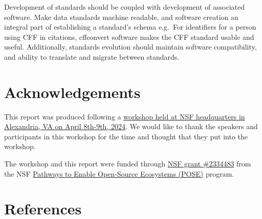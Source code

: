 \documentclass[
  letterpaper,
  DIV=11,
  numbers=noendperiod]{scrartcl}
\begin{document}
Development of standards should be coupled with development of
associated software. Make data standards machine readable, and software
creation an integral part of establishing a standard's schema e.g.~For
identifiers for a person using CFF in citations, cffconvert software
makes the CFF standard usable and useful. Additionally, standards
evolution should maintain software compatibility, and ability to
translate and migrate between standards.

\section{Acknowledgements}\label{acknowledgements}

This report was produced following a
\href{https://uwescience.github.io/2024-open-source-standards-workshop/}{workshop
held at NSF headquarters in Alexandria, VA on April 8th-9th, 2024}. We
would like to thank the speakers and participants in this workshop for
the time and thought that they put into the workshop.

The workshop and this report were funded through
\href{https://www.nsf.gov/awardsearch/showAward?AWD_ID=2334483&HistoricalAwards=false}{NSF
grant \#2334483} from the NSF
\href{https://new.nsf.gov/funding/opportunities/pathways-enable-open-source-ecosystems-pose}{Pathways
to Enable Open-Source Ecosystems (POSE)} program.

\section*{References}\label{references}
\end{document}
